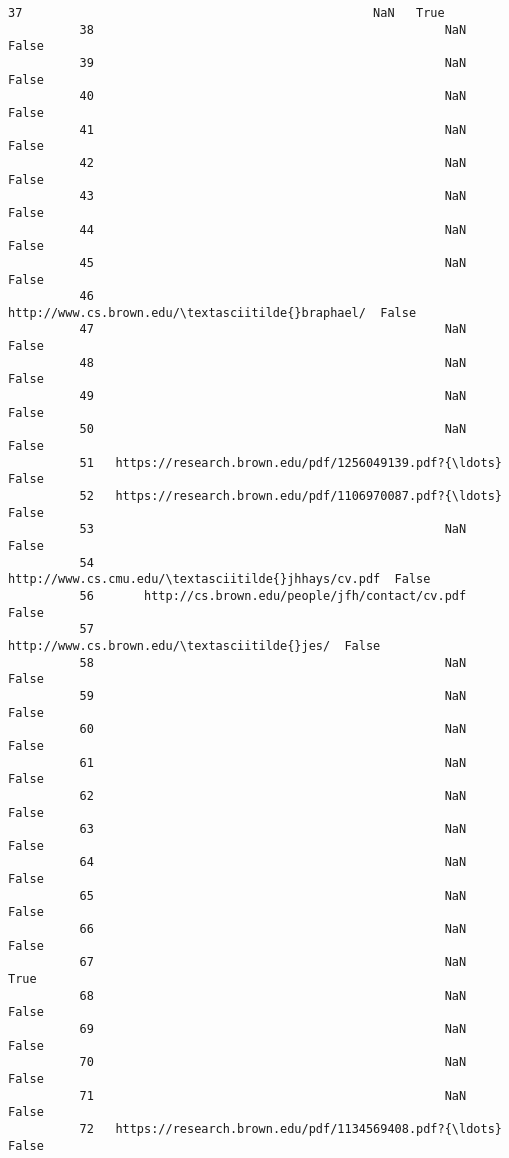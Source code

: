 \documentclass[11pt]{article}
\begin{document}
\begin{Verbatim}[commandchars=\\\{\}]
          37                                                 NaN   True  
          38                                                 NaN  False  
          39                                                 NaN  False  
          40                                                 NaN  False  
          41                                                 NaN  False  
          42                                                 NaN  False  
          43                                                 NaN  False  
          44                                                 NaN  False  
          45                                                 NaN  False  
          46                  http://www.cs.brown.edu/\textasciitilde{}braphael/  False  
          47                                                 NaN  False  
          48                                                 NaN  False  
          49                                                 NaN  False  
          50                                                 NaN  False  
          51   https://research.brown.edu/pdf/1256049139.pdf?{\ldots}  False  
          52   https://research.brown.edu/pdf/1106970087.pdf?{\ldots}  False  
          53                                                 NaN  False  
          54                http://www.cs.cmu.edu/\textasciitilde{}jhhays/cv.pdf  False  
          56       http://cs.brown.edu/people/jfh/contact/cv.pdf  False  
          57                       http://www.cs.brown.edu/\textasciitilde{}jes/  False  
          58                                                 NaN  False  
          59                                                 NaN  False  
          60                                                 NaN  False  
          61                                                 NaN  False  
          62                                                 NaN  False  
          63                                                 NaN  False  
          64                                                 NaN  False  
          65                                                 NaN  False  
          66                                                 NaN  False  
          67                                                 NaN   True  
          68                                                 NaN  False  
          69                                                 NaN  False  
          70                                                 NaN  False  
          71                                                 NaN  False  
          72   https://research.brown.edu/pdf/1134569408.pdf?{\ldots}  False  

\end{Verbatim}
\end{document}

